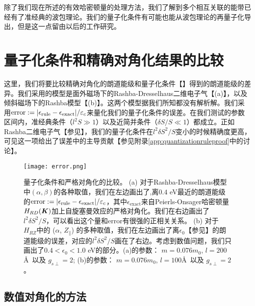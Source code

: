 除了我们现在所述的有效哈密顿量的处理方法，我们了解到多个相互关联的能带\cite{culcer_coherent_2005}已经有了准经典的波包理论。我们的量子化条件有可能也能从波包理论的再量子化导出\cite{xiao_berry_2010}，但是这一点留由以后的工作研究。

\chapter{量子化条件和精确对角化结果的比较}\label{app:approximatevsexact}

这里，我们将要比较精确对角化的朗道能级和量子化条件【】得到的朗道能级的差异。我们采用的模型是面外磁场下的Rashba-Dresselhaus二维电子气【(a)】，以及倾斜磁场下的Rashba模型【(b)】。这两个模型据我们所知都没有解析解。我们采用$\text{error}:=|\epsilon_\text{rule}-\epsilon_\text{exact}|/\varepsilon_c$来量化我们的量子化条件的误差。在我们测试的参数区间内，准经典条件（$l^2 S\gg 1$）以及近简并条件（$\delta S/S\ll 1$）都成立。正如Rashba二维电子气【参见】，我们的量子化条件在$l^2\delta S^2/S$变小的时候精确度更高，可见这一项给出了误差中的主导贡献【参见附录\ref{app:quantizationruleproof}中的讨论】。


\begin{figure}
\texttt{[image: error.png]}
\caption{{量子化条件和严格对角化的比较。 (a) 对于Rashba-Dresselhaus模型中$(\alpha,\beta)$的各种取值，我们在左边画出了,离$0.4$ eV最近的朗道能级的$\text{error}:=|\epsilon_\text{rule}-\epsilon_\text{exact}|/\varepsilon_c$，其中$\epsilon_{\text{exact}}$来自Peierls-Onsager哈密顿量$H_{RD}(\boldsymbol{K})$加上自旋塞曼效应的严格对角化。我们在右边画出了$l^2\delta S^2/S$，可以看出这个量和$\text{error}$有很强的正相关关系。 (b) 对于$H_{RZ}$中的 ($\alpha$, $Z_\parallel$) 的多种取值，我们在左边画出了离$\epsilon_0$【参见】的朗道能级的误差，对应的$l^2 \delta S^2/S$画在了右边。考虑到数值问题，我们只画出了$0.4{<}\epsilon_0{<}1.0$ eV的部分。(a)的参数： $m=0.076m_0$, $l=200$\AA~以及 $g_{s\perp}=2$; (b)的参数： $m=0.076m_0$, $l=100$\AA~以及 $g_{s\perp}=2$。}\label{fig:error}}
\end{figure}


\section{数值对角化的方法}\label{sec:numerical}

